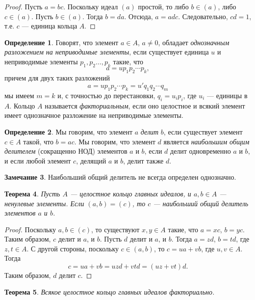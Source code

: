 \documentclass[12pt, titlepage, oneside]{amsbook}
\newtheorem{theorem}{Теорема}[chapter]
\theoremstyle{definition}
\newtheorem{definition}[theorem]{Определение}
\newtheorem{remark}[theorem]{Замечание}
\theoremstyle{remark}
\begin{document}
\begin{proof}
	Пусть $a=bc$. Поскольку идеал $(a)$ простой, то либо $b\in(a)$, либо $c\in(a)$. Пусть $b\in(a)$. Тогда $b=da$. Отсюда, $a=adc$. Следовательно, $cd=1$, т.е. $c$ --- единица кольца $A$.
\end{proof}


\begin{definition}
	Говорят, что элемент $a\in A$, $a\neq 0$, обладает \emph{однозначным разложением на неприводимые элементы}, если существует единица $u$ и неприводимые элементы $p_1,p_2\ldots,p_k$ такие, что $$a=up_1p_2\cdots p_k,$$ причем для двух таких разложений $$a=up_1p_2\cdots p_k=u' q_1q_2\cdots q_m$$ мы имеем $m=k$ и, с точностью до перестановки, $q_i=u_i p_i$, где $u_i$ --- единицы в $A$. Кольцо $A$ называется \emph{факториальным}, если оно целостное и всякий элемент имеет однозначное разложение на неприводимые элементы.
\end{definition}


\begin{definition}
	Мы говорим, что элемент $a$ \emph{делит} $b$, если существует элемент $c\in A$ такой, что $b=ac$. Мы говорим, что элемент $d$ является \emph{наибольшим общим делителем} (сокращенно НОД) элементов $a$ и $b$, если $d$ делит одновременно $a$ и $b$, и если любой элемент $c$, делящий $a$ и $b$, делит также $d$.
\end{definition}

\begin{remark}
	Наибольший общий делитель не всегда определен однозначно.
\end{remark}

\begin{theorem}
	\label{Gl2} Пусть $A$ --- целостное кольцо главных идеалов, и $a,b\in A$ --- ненулевые элементы. Если $(a,b)=(c)$, то $c$ --- наибольший общий делитель элементов $a$ и $b$.
\end{theorem}

\begin{proof}
	Поскольку $a,b\in(c)$, то существуют $x,y\in A$ такие, что $a=xc$, $b=yc$. Таким образом, $c$ делит и $a$, и $b$. Пусть $d$ делит и $a$, и $b$. Тогда $a=zd$, $b=td$, где $z,t\in A$. С другой стороны, поскольку $c\in(a,b)$, то $c=ua+vb$, где $u,v\in A$. Тогда $$c=ua+vb=uzd+vtd=(uz+vt)d.$$ Таким образом, $d$ делит $c$.
\end{proof}

\begin{theorem}
	\label{Factor} Всякое целостное кольцо главных идеалов факториально.
\end{theorem}
\end{document}
